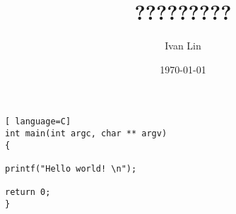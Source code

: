 \documentclass[UTF8]{ctexart}
\title{?????????}
\author{Ivan Lin}
\date{\today}
\begin{document}
\maketitle

\begin{lstlisting}[ language=C]
int main(int argc, char ** argv)
{

printf("Hello world! \n");

return 0;
}
\end{lstlisting}
\end{document}
